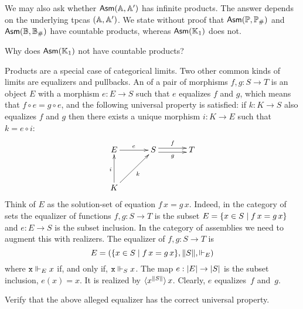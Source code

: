 We may also ask whether $\AsmA$ has infinite products. The answer depends on the underlying tpcas $(\AA, \subAA)$. We state without proof that $\Asm{\Scott, \comp{\Scott}}$ and $\Asm{\Baire, \comp{\Baire}}$ have countable products, whereas $\Asm{\klone}$ does not.

\begin{exercise}
  Why does $\Asm{\klone}$ not have countable products?
\end{exercise}

Products are a special case of categorical limits. Two other common
kinds of limits are equalizers and pullbacks. An  of a
pair of morphisms $f, g : S \to T$ is an object $E$ with a morphism $e
: E \to S$ such that $e$ equalizes $f$ and $g$, which means that $f
\circ e = g \circ e$, and the following universal property is
satisfied: if $k : K \to S$ also equalizes $f$ and $g$ then there
exists a unique morphism $i : K \to E$ such that $k = e \circ i$:
%
\begin{equation*}
  \xymatrix@+1em{
    {E}
    \ar[r]^{e}
    &
    {S}
    \ar@<+0.25em>[r]^{f}
    \ar@<-0.25em>[r]_{g}
    &
    {T}
    \\
    {K}
    \ar[u]^{i}
    \ar[ru]_{k}
    & & 
  }
\end{equation*}
%
Think of $E$ as the solution-set of equation $f\,x =
g\,x$.
%
Indeed, in the category of sets the equalizer of functions $f, g : S
\to T$ is the subset $E = \set{x \in S \such f\,x = g\,x}$ and $e : E
\to S$ is the subset inclusion. In the category of assemblies we need
to augment this with realizers. The equalizer of $f, g : S \to
T$ is
%
\begin{equation}
  \label{eq:asm-equalizer}%
  E =
  (\set{x \in S \such f\,x = g\,x},
   \T{S},
   {\rz[E]})
\end{equation}
%
where $\R{x} \rz[E] x$ if, and only if, $\R{x} \rz[S] x$. The map $e : \S{E}
\to \S{S}$ is the subset inclusion, $e(x) = x$. It is realized by
$\tpcalam{x}{\T{S}} x$. Clearly, $e$ equalizes~$f$ and~$g$.

\begin{exercise}
  Verify that the above alleged equalizer has the correct universal property.
\end{exercise}

